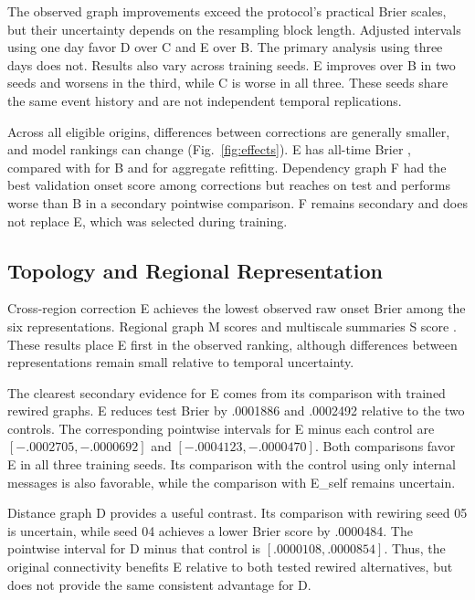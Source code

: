 \documentclass{llncs}
\begin{document}
The observed graph improvements exceed the protocol's practical Brier scales, but their uncertainty depends on the resampling block length. Adjusted intervals using one day favor D over C and E over B. The primary analysis using three days does not. Results also vary across training seeds. E improves over B in two seeds and worsens in the third, while C is worse in all three. These seeds share the same event history and are not independent temporal replications.

Across all eligible origins, differences between corrections are generally smaller, and model rankings can change (Fig.~\ref{fig:effects}). E has all-time Brier \TestAllE{}, compared with \TestAllB{} for B and \TestAllRUnion{} for aggregate refitting. Dependency graph F had the best validation onset score among corrections but reaches \TestOnF{} on test and performs worse than B in a secondary pointwise comparison. F remains secondary and does not replace E, which was selected during training.




\subsection{Topology and Regional Representation}
Cross-region correction E achieves the lowest observed raw onset Brier among the six representations. Regional graph M scores \TestOnM{} and multiscale summaries S score \TestOnS{}. These results place E first in the observed ranking, although differences between representations remain small relative to temporal uncertainty.

The clearest secondary evidence for E comes from its comparison with trained rewired graphs. E reduces test Brier by .0001886 and .0002492 relative to the two controls. The corresponding pointwise intervals for E minus each control are $[-.0002705,\allowbreak -.0000692]$ and $[-.0004123,\allowbreak -.0000470]$. Both comparisons favor E in all three training seeds. Its comparison with the control using only internal messages is also favorable, while the comparison with E\_self remains uncertain.

Distance graph D provides a useful contrast. Its comparison with rewiring seed 05 is uncertain, while seed 04 achieves a lower Brier score by .0000484. The pointwise interval for D minus that control is $[.0000108,\allowbreak .0000854]$. Thus, the original connectivity benefits E relative to both tested rewired alternatives, but does not provide the same consistent advantage for D.
\end{document}
